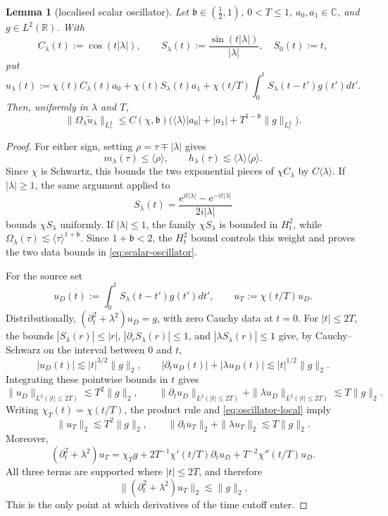 \documentclass[11pt,reqno]{amsart}
\theoremstyle{plain}
\newtheorem{lemma}[theorem]{Lemma}
\theoremstyle{definition}
\theoremstyle{remark}
\numberwithin{equation}{section}
\newcommand{\breg}{\mathfrak b}
\newcommand{\Real}{\mathbb R}
\begin{document}
\begin{lemma}[localised scalar oscillator]\label{lem:oscillator}
Let $\breg\in(\frac12,1)$, $0<T\le1$, $a_0,a_1\in\mathbb C$, and
$g\in L^2(\Real)$.  With
\[
 C_\lambda(t):=\cos(t|\lambda|),\qquad
 S_\lambda(t):=\frac{\sin(t|\lambda|)}{|\lambda|},\quad S_0(t):=t,
\]
put
\[
 u_\lambda(t):=\chi(t)C_\lambda(t)a_0+\chi(t)S_\lambda(t)a_1
 +\chi(t/T)\int_0^tS_\lambda(t-t')g(t') dt'.
\]
Then, uniformly in $\lambda$ and $T$,
\begin{equation}\label{eq:scalar-oscillator}
 \big\|\Omega_\lambda\widetilde u_\lambda\big\|_{L^2_\tau}
 \le C(\chi,\breg)\Big(
 \langle\lambda\rangle|a_0|+|a_1|
 +T^{1-\breg}\|g\|_{L^2_t}\Big).
\end{equation}
\end{lemma}

\begin{proof}
For either sign, setting $\rho=\tau\mp|\lambda|$ gives
\[
 m_\lambda(\tau)\le\langle\rho\rangle,\qquad
 h_\lambda(\tau)\lesssim\langle\lambda\rangle\langle\rho\rangle.
\]
Since $\chi$ is Schwartz, this bounds the two exponential pieces of
$\chi C_\lambda$ by $C\langle\lambda\rangle$.  If $|\lambda|\ge1$, the same
argument applied to
\[
 S_\lambda(t)=\frac{\mathrm e^{it|\lambda|}-\mathrm e^{-it|\lambda|}}
 {2i|\lambda|}
\]
bounds $\chi S_\lambda$ uniformly.  If $|\lambda|\le1$, the family
$\chi S_\lambda$ is bounded in $H^2_t$, while
$\Omega_\lambda(\tau)\lesssim\langle\tau\rangle^{1+\breg}$.  Since
$1+\breg<2$, the $H^2_t$ bound controls this weight and proves the two data
bounds in \eqref{eq:scalar-oscillator}.

For the source set
\[
 u_D(t):=\int_0^tS_\lambda(t-t')g(t') dt',
 \qquad u_T:=\chi(t/T)u_D .
\]
Distributionally,
$(\partial_t^2+\lambda^2)u_D=g$, with zero Cauchy data at $t=0$.
For $|t|\le2T$, the bounds
$|S_\lambda(r)|\le|r|$, $|\partial_rS_\lambda(r)|\le1$, and
$|\lambda S_\lambda(r)|\le1$ give, by Cauchy--Schwarz on the interval
between $0$ and $t$,
\[
 |u_D(t)|\lesssim |t|^{3/2}\|g\|_2,
 \qquad
 |\partial_tu_D(t)|+|\lambda u_D(t)|
 \lesssim |t|^{1/2}\|g\|_2.
\]
Integrating these pointwise bounds in $t$ gives
\begin{equation}\label{eq:oscillator-local}
 \|u_D\|_{L^2(|t|\le2T)}\lesssim T^2\|g\|_2,\qquad
 \|\partial_tu_D\|_{L^2(|t|\le2T)}
 +\|\lambda u_D\|_{L^2(|t|\le2T)}
 \lesssim T\|g\|_2 .
\end{equation}
Writing $\chi_T(t)=\chi(t/T)$, the product rule and
\eqref{eq:oscillator-local} imply
\[
 \|u_T\|_2\lesssim T^2\|g\|_2,\qquad
 \|\partial_tu_T\|_2+\|\lambda u_T\|_2\lesssim T\|g\|_2.
\]
Moreover,
\[
 (\partial_t^2+\lambda^2)u_T
 =\chi_Tg+2T^{-1}\chi'(t/T)\partial_tu_D
   +T^{-2}\chi''(t/T)u_D.
\]
All three terms are supported where $|t|\le2T$, and therefore
\begin{equation}\label{eq:oscillator-cutoff-source}
 \|(\partial_t^2+\lambda^2)u_T\|_2\lesssim\|g\|_2.
\end{equation}
This is the only point at which derivatives of the time cutoff enter.


\end{proof}
\end{document}
